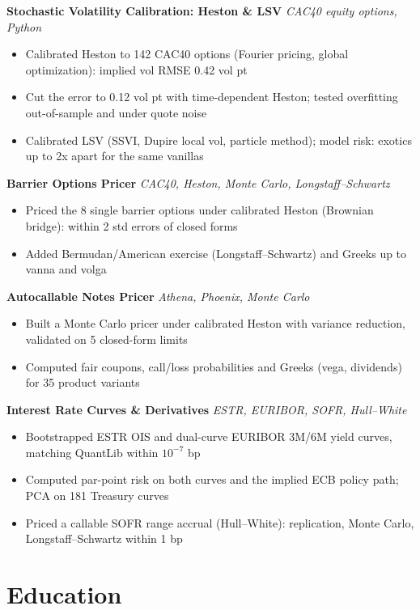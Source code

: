 \documentclass[11pt,a4paper]{article}
\newcommand{\project}[2]{\textbf{#1} \textendash{} \textit{#2}\par\vspace{0pt}}
\begin{document}
\project{Stochastic Volatility Calibration: Heston \& LSV}{CAC40 equity options, Python}
\begin{itemize}
  \item Calibrated Heston to 142 CAC40 options (Fourier pricing, global optimization): implied vol RMSE 0.42 vol pt
  \item Cut the error to 0.12 vol pt with time-dependent Heston; tested overfitting out-of-sample and under quote noise
  \item Calibrated LSV (SSVI, Dupire local vol, particle method); model risk: exotics up to 2x apart for the same vanillas
\end{itemize}

\project{Barrier Options Pricer}{CAC40, Heston, Monte Carlo, Longstaff--Schwartz}
\begin{itemize}
  \item Priced the 8 single barrier options under calibrated Heston (Brownian bridge): within 2 std errors of closed forms
  \item Added Bermudan/American exercise (Longstaff--Schwartz) and Greeks up to vanna and volga
\end{itemize}

\project{Autocallable Notes Pricer}{Athena, Phoenix, Monte Carlo}
\begin{itemize}
  \item Built a Monte Carlo pricer under calibrated Heston with variance reduction, validated on 5 closed-form limits
  \item Computed fair coupons, call/loss probabilities and Greeks (vega, dividends) for 35 product variants
\end{itemize}

\project{Interest Rate Curves \& Derivatives}{ESTR, EURIBOR, SOFR, Hull--White}
\begin{itemize}
  \item Bootstrapped ESTR OIS and dual-curve EURIBOR 3M/6M yield curves, matching QuantLib within $10^{-7}$ bp
  \item Computed par-point risk on both curves and the implied ECB policy path; PCA on 181 Treasury curves
  \item Priced a callable SOFR range accrual (Hull--White): replication, Monte Carlo, Longstaff--Schwartz within 1 bp
\end{itemize}

\section{Education}
\end{document}
